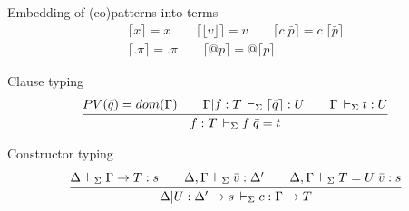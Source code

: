 \documentclass[acmlarge]{acmart}\settopmatter{}
\renewcommand{\|}{\mid}
\begin{document}
Embedding of (co)patterns into terms 
\begin{gather*}
\lceil x \rceil = x \qquad
\lceil \lfloor v \rfloor \rceil = v \qquad
\lceil c\; \bar{p} \rceil = c\; \lceil \bar{p} \rceil \\
\lceil .\pi \rceil = .\pi \qquad
\lceil @p \rceil = @ \lceil p \rceil
\end{gather*}


%
%

Clause typing 
\begin{gather*}
\ru{PV(\bar{q}) = dom(\Gamma) \qquad
    \Gamma | f : T \ders \lceil \bar{q} \rceil : U \qquad
    \Gamma \ders t : U}
   {f : T \ders f\; \bar{q} = t}
\end{gather*}

Constructor typing 
\begin{gather*}
\ru{\Delta \ders \Gamma \rightarrow T : s \qquad
    \Delta,\Gamma \ders \bar{v} : \Delta' \qquad
    \Delta,\Gamma \ders T = U\; \bar{v} : s}
   {\Delta | U : \Delta' \rightarrow s \ders c : \Gamma \rightarrow T}
\end{gather*}
\end{document}
